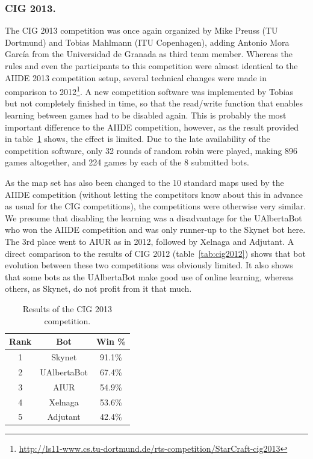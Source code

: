 \documentclass{llncs}
\begin{document}
\subsubsection*{CIG 2013.} The CIG 2013 competition was once again
organized by Mike Preuss (TU Dortmund) and Tobias Mahlmann (ITU Copenhagen),
adding Antonio Mora Garc{\'i}a from the Universidad de Granada as
third team member. Whereas the rules and even the participants
to this competition were almost identical to the AIIDE 2013
competition setup, several technical changes were made in comparison
to 2012\footnote{\url{http://ls11-www.cs.tu-dortmund.de/rts-competition/StarCraft-cig2013}}.
A new competition software was implemented by Tobias but
not completely finished in time, so that the read/write function
that enables learning between games had to be disabled again. 
This is probably the most important difference to the AIIDE competition,
however, as the result provided in table~\ref{tab:cig2013} shows, the effect is
limited. Due to the late availability of the competition software,
only 32 rounds of random robin were played, making 896 games
altogether, and 224 games by each of the 8 submitted bots. 

As the map set has also been changed to the 10 standard
maps used by the AIIDE competition (without letting the competitors
know about this in advance as usual for the CIG competitions), 
the competitions were otherwise very similar. We presume that 
disabling the learning was a disadvantage for the UAlbertaBot who
won the AIIDE competition and was only runner-up to the Skynet bot
here. The 3rd place went to AIUR as in 2012, followed by 
Xelnaga and Adjutant. A direct comparison to the results of
CIG 2012 (table~\ref{tab:cig2012}) shows that bot evolution 
between these two competitions was obviously limited. It also
shows that some bots as the UAlbertaBot make good use of 
online learning, whereas others, as Skynet, do not profit from
it that much.




\begin{table}[t]
\caption{Results of the CIG 2013 competition.}
\label{tab:cig2013}
\centering
\begin{tabular}{|c|c|c|}
\hline
{\bfseries Rank} & {\bfseries Bot} & {\bfseries Win \%} \\
\hline
1 & Skynet & 91.1\% \\
2 & UAlbertaBot & 67.4\% \\
3 & AIUR & 54.9\% \\
4 & Xelnaga & 53.6\% \\
5 & Adjutant & 42.4\% \\ 
\hline
\end{tabular}
\end{table}
\end{document}
